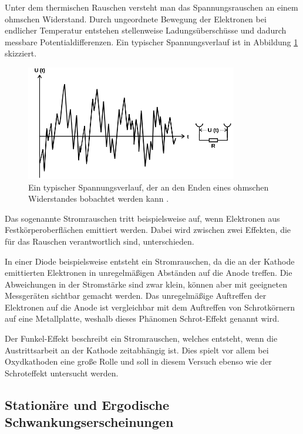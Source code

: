 Unter dem thermischen Rauschen versteht man das Spannungsrauschen an einem ohmschen Widerstand. Durch
ungeordnete Bewegung der Elektronen bei endlicher Temperatur entstehen stellenweise Ladungsüberschüsse
und dadurch messbare Potentialdifferenzen. Ein typischer Spannungsverlauf ist in Abbildung \ref{fig:thermtyp}
skizziert.

\begin{figure}
  \centering
  \includegraphics[height=5cm]{Dickpics/thermtyp.png}
  \caption{Ein typischer Spannungsverlauf, der an den Enden eines ohmschen Widerstandes bobachtet werden kann \cite{fig:thermtyp}.}
  \label{fig:thermtyp}
\end{figure}

Das sogenannte Stromrauschen tritt beispielsweise auf, wenn Elektronen aus Festkörperoberflächen emittiert werden.
Dabei wird zwischen zwei Effekten, die für das Rauschen verantwortlich sind, unterschieden.

In einer Diode beispielsweise entsteht ein Stromrauschen, da die an der Kathode emittierten Elektronen in unregelmäßigen Abständen
auf die Anode treffen. Die Abweichungen in der Stromstärke sind zwar klein, können aber mit geeigneten Messgeräten
sichtbar gemacht werden. Das unregelmäßige Auftreffen der Elektronen auf die Anode ist vergleichbar mit dem Auftreffen von Schrotkörnern
auf eine Metallplatte, weshalb dieses Phänomen Schrot-Effekt genannt wird.

Der Funkel-Effekt beschreibt ein Stromrauschen, welches entsteht, wenn die Austrittsarbeit an der Kathode zeitabhängig ist.
Dies spielt vor allem bei Oxydkathoden eine große Rolle und soll in diesem Versuch ebenso wie der Schroteffekt untersucht
werden.

\subsection{Stationäre und Ergodische Schwankungserscheinungen}

